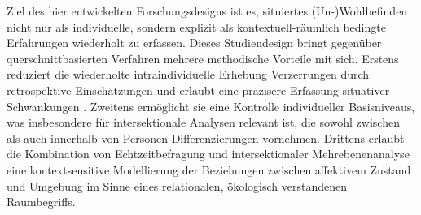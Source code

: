 Ziel des hier entwickelten Forschungsdesigns ist es, situiertes (Un\nobreakdash-)Wohlbefinden nicht nur als individuelle, sondern explizit als kontextuell-räumlich bedingte Erfahrungen wiederholt zu erfassen. Dieses Studiendesign bringt gegenüber querschnittbasierten Verfahren mehrere methodische Vorteile mit sich. Erstens reduziert die wiederholte intraindividuelle Erhebung Verzerrungen durch retrospektive Einschätzungen und erlaubt eine präzisere Erfassung situativer Schwankungen \parencite{randallDevelopmentTrialMobile2013}. Zweitens ermöglicht sie eine Kontrolle individueller Basisniveaus, was insbesondere für intersektionale Analysen relevant ist, die sowohl zwischen als auch innerhalb von Personen Differenzierungen vornehmen. Drittens erlaubt die Kombination von Echtzeitbefragung und intersektionaler Mehrebenenanalyse eine kontextsensitive Modellierung der Beziehungen zwischen affektivem Zustand und Umgebung im Sinne eines relationalen, ökologisch verstandenen Raumbegriffs.
